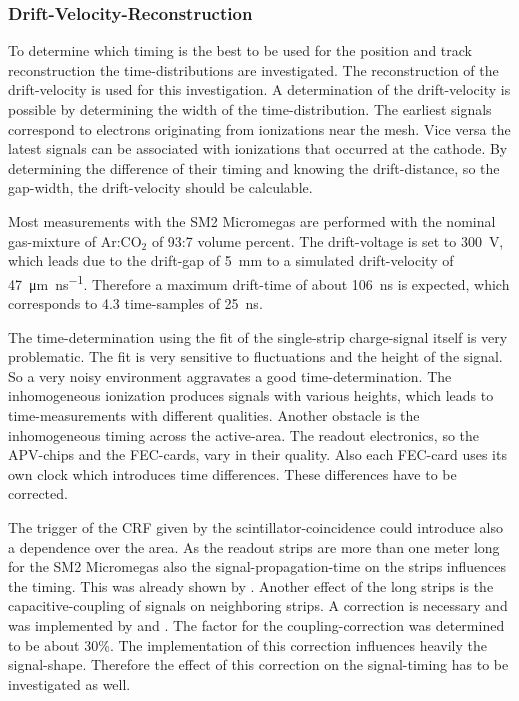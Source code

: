 \documentclass[
twoside,            %
BCOR1.4cm,          %
10pt,               %
headings=normal,    %
headsepline,        %
clearplainpage,		%
final,              %
div=14,
open=right,
bibliography=toc
]{scrreprt}
\begin{document}
\subsubsection{Drift-Velocity-Reconstruction}

To determine which timing is the best to be used for the position and track reconstruction the time-distributions are investigated.
The reconstruction of the drift-velocity is used for this investigation.
A determination of the drift-velocity is possible by determining the width of the time-distribution.
The earliest signals correspond to electrons originating from ionizations near the mesh.
Vice versa the latest signals can be associated with ionizations that occurred at the cathode.
By determining the difference of their timing and knowing the drift-distance, so the gap-width, the drift-velocity should be calculable.

Most measurements with the SM2 Micromegas are performed with the nominal gas-mixture of Ar:CO$_{2}$ of 93:7 volume percent.
The drift-voltage is set to \SI{300}{V}, which leads due to the drift-gap of \SI{5}{mm} to a simulated drift-velocity of \SI{47}{\micro\m\per\ns}.
Therefore a maximum drift-time of about \SI{106}{ns} is expected, which corresponds to 4.3 time-samples of \SI{25}{ns}.

The time-determination using the fit of the single-strip charge-signal itself is very problematic.
The fit is very sensitive to fluctuations and the height of the signal.
So a very noisy environment aggravates a good time-determination.
The inhomogeneous ionization produces signals with various heights, which leads to time-measurements with different qualities.
Another obstacle is the inhomogeneous timing across the active-area.
The readout electronics, so the APV-chips and the FEC-cards, vary in their quality.
Also each FEC-card uses its own clock which introduces time differences.
These differences have to be corrected.

The trigger of the CRF given by the scintillator-coincidence could introduce also a dependence over the area.
As the readout strips are more than one meter long for the SM2 Micromegas also the signal-propagation-time on the strips influences the timing.
This was already shown by \cite{loeselMaster}.
Another effect of the long strips is the capacitive-coupling of signals on neighboring strips.
A correction is necessary and was implemented by \cite{loeselMaster} and \cite{flierlThesis}.
The factor for the coupling-correction was determined to be about 30\%.
The implementation of this correction influences heavily the signal-shape.
Therefore the effect of this correction on the signal-timing has to be investigated as well.
\end{document}
